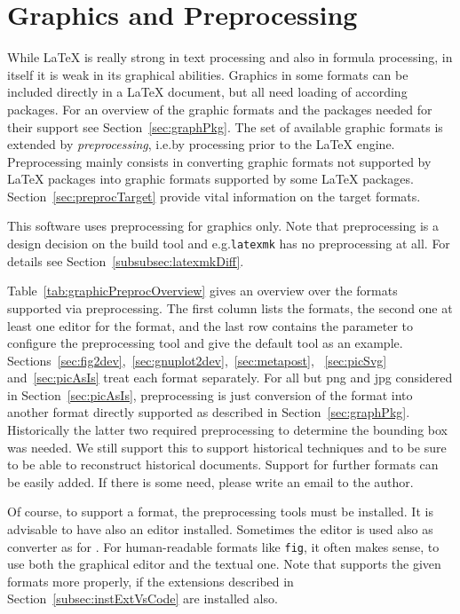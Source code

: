 \chapter{Graphics and Preprocessing}\label{chap:GraphConversions}

While \LaTeX{} is really strong in text processing 
and also in formula processing, 
in itself it is weak in its graphical abilities. 
Graphics in some formats can be included directly in a \LaTeX{} document, 
but all need loading of according packages. 
For an overview of the graphic formats and the packages needed for their support 
see Section~\ref{sec:graphPkg}. 
The set of available graphic formats is extended by \emph{preprocessing}, 
i.e.\@ by processing prior to the \LaTeX{} engine. 
Preprocessing mainly consists in converting 
graphic formats not supported by \LaTeX{} packages 
into graphic formats supported by some \LaTeX{} packages. 
Section~\ref{sec:preprocTarget} provide vital information 
on the target formats. 

This software uses preprocessing for graphics only. 
Note that preprocessing is a design decision on the build tool 
and e.g.\@ \texttt{latexmk} has no preprocessing at all. 
For details see Section~\ref{subsubsec:latexmkDiff}. 


Table~\ref{tab:graphicPreprocOverview} 
gives an overview over the formats supported via preprocessing. 
The first column lists the formats, the second one at least one editor for the format, 
and the last row contains the parameter to configure the preprocessing tool 
and give the default tool as an example. 
Sections~\ref{sec:fig2dev},~\ref{sec:gnuplot2dev},~\ref{sec:metapost},~%
\ref{sec:picSvg} and~\ref{sec:picAsIs} treat each format separately. 
For all but \gls{png} and \gls{jpg} considered in Section~\ref{sec:picAsIs}, 
preprocessing is just conversion of the format 
into another format directly supported as described in Section~\ref{sec:graphPkg}. 
Historically the latter two required preprocessing 
to determine the bounding box was needed. 
We still support this to support historical techniques and to be sure 
to be able to reconstruct historical documents. 
Support for further formats can be easily added. 
If there is some need, please write an email to the author. 

Of course, to support a format, the preprocessing tools must be installed. 
It is advisable to have also an editor installed. 
Sometimes the editor is used also as converter as for . 
For human-readable formats like \texttt{fig}, it often makes sense, 
to use both the graphical editor and the textual one. 
Note that  supports the given formats more properly, 
if the extensions described in Section~\ref{subsec:instExtVsCode} are installed also. 

